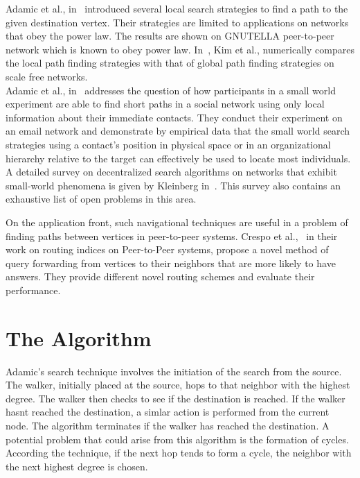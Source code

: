\documentclass[a4paper,12pt]{article}
\begin{document}
Adamic et al., in~\cite{adamic01} introduced several local search strategies to find a path to the given destination vertex. Their strategies are limited to applications on networks that obey the power law. The results are shown on GNUTELLA peer-to-peer network which is known to obey power law. In~\cite{kim02}, Kim et al., numerically compares the local path finding strategies with that of global path finding strategies on scale free networks.\\ 

Adamic et al., in~\cite{adamic05} addresses the question of how participants in a small world experiment are able to find short paths in a social network using only local information about their immediate contacts. They conduct their experiment on an email network and demonstrate by empirical data that the small world search strategies using a contact's position in physical space or in an organizational hierarchy relative to the target can effectively be used to locate most individuals.\\

A detailed survey on decentralized search algorithms on networks that exhibit small-world phenomena is given by Kleinberg in~\cite{kleinberg06}. This survey also contains an exhaustive list of open problems in this area.

On the application front, such navigational techniques are useful in a problem of finding paths between vertices in peer-to-peer systems.  Crespo et al.,~\cite{crespo02} in their work on routing indices on Peer-to-Peer systems, propose a novel method of query forwarding from vertices to their neighbors that are more likely to have answers. They provide different novel routing schemes and evaluate their performance.

\newpage
\section{The Algorithm}
\label{sec:idea}
Adamic's search technique involves the initiation of the search from the source. The walker, initially placed at the source, hops to that neighbor with the highest degree. The walker then checks to see if the destination is reached. If the walker hasnt reached the destination, a simlar action is performed from the current node. The algorithm terminates if the walker has reached the destination. A potential problem that could arise from this algorithm is the formation of cycles. According the technique, if the next hop tends to form a cycle, the neighbor with the next highest degree is chosen.
\end{document}
